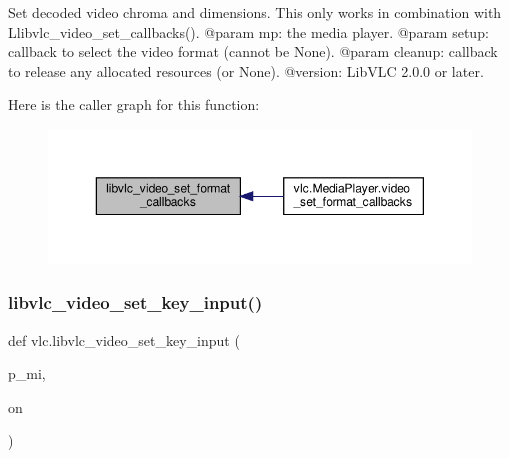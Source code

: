 \begin{DoxyVerb}Set decoded video chroma and dimensions. This only works in combination with
L{libvlc_video_set_callbacks}().
@param mp: the media player.
@param setup: callback to select the video format (cannot be None).
@param cleanup: callback to release any allocated resources (or None).
@version: LibVLC 2.0.0 or later.
\end{DoxyVerb}
 Here is the caller graph for this function\+:
\nopagebreak
\begin{figure}[H]
\begin{center}
\leavevmode
\includegraphics[width=350pt]{namespacevlc_a285e546903b5f0a9e27beb4d2763dab3_icgraph}
\end{center}
\end{figure}
\mbox{\label{namespacevlc_a76625220c6c679321e8b22df8a1070d1}} 
\subsubsection{\texorpdfstring{libvlc\+\_\+video\+\_\+set\+\_\+key\+\_\+input()}{libvlc\_video\_set\_key\_input()}}
{\footnotesize\ttfamily def vlc.\+libvlc\+\_\+video\+\_\+set\+\_\+key\+\_\+input (\begin{DoxyParamCaption}\item[{}]{p\+\_\+mi,  }\item[{}]{on }\end{DoxyParamCaption})}

